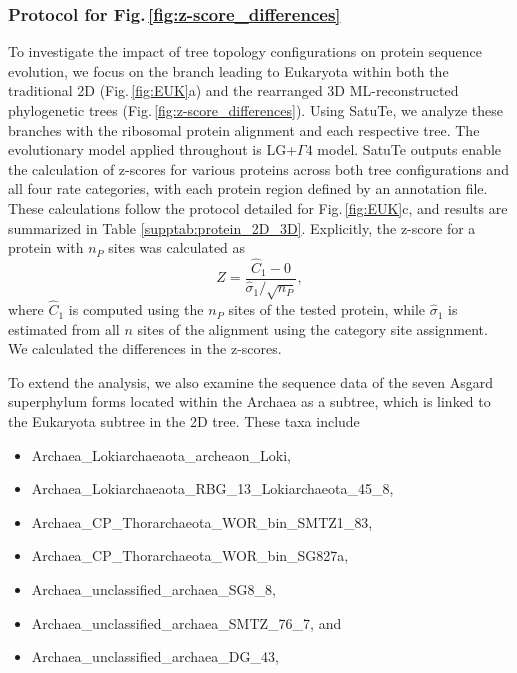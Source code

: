 \subsubsection*{Protocol for Fig.\,\ref{fig:z-score_differences}}

To investigate the impact of tree topology configurations on protein sequence evolution, we focus on the branch leading to Eukaryota within both the traditional 2D (Fig.\,\ref{fig:EUK}a) and the rearranged
3D ML-reconstructed phylogenetic trees (Fig.\,\ref{fig:z-score_differences}). Using SatuTe, we analyze these branches with the ribosomal protein alignment and each respective tree. The evolutionary model applied throughout is LG+$\Gamma 4$ model. SatuTe outputs enable the calculation of z-scores for various proteins across both tree configurations and all four rate categories, with each protein region defined by an annotation file. These calculations follow the protocol detailed for Fig.\,\ref{fig:EUK}c, and results are summarized in Table \ref{supptab:protein_2D_3D}. Explicitly, the z-score for a protein with $n_P$ sites was calculated as
\begin{equation}
Z = \frac{\hat{C}_1-0}
{
\hat\sigma_1/\sqrt{n_P}
},
\end{equation}
where $\hat{C}_1$ is computed using the $n_P$ sites of the tested protein, while $\hat\sigma_1$ is estimated from all $n$ sites of the alignment using the category site assignment. We calculated the differences in the z-scores. 

\medskip

To extend the analysis, we also examine the sequence data of the seven Asgard superphylum forms located within the Archaea as a subtree, which is linked to the Eukaryota subtree in the 2D tree. These taxa include

\begin{itemize}
\item Archaea{\_}Lokiarchaeaota{\_}archeaon{\_}Loki,
\item Archaea{\_}Lokiarchaeaota{\_}RBG{\_}13{\_}Lokiarchaeota{\_}45{\_}8,
\item Archaea{\_}CP{\_}Thorarchaeota{\_}WOR{\_}bin{\_}SMTZ1{\_}83,
\item Archaea{\_}CP{\_}Thorarchaeota{\_}WOR{\_}bin{\_}SG827a,
\item Archaea{\_}unclassified{\_}archaea{\_}SG8{\_}8,
\item Archaea{\_}unclassified{\_}archaea{\_}SMTZ{\_}76{\_}7, and 
\item Archaea{\_}unclassified{\_}archaea{\_}DG{\_}43,
\end{itemize}

